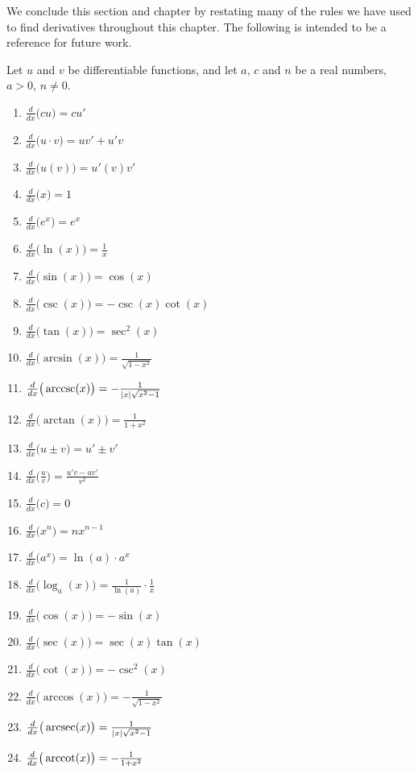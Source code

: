 We conclude this section and chapter by restating many of the rules we have used to find derivatives throughout this chapter. The following is intended to be a reference for future work.

{Let $u$ and $v$ be differentiable functions, and let $a$, $c$ and $n$ be a real numbers, $a>0$, $n\neq 0$. \\ \small

\bmtwo
\begin{enumerate}[1)]
\item $\frac{d}{dx}\big(cu\big) = cu'$
\item $\frac{d}{dx}\big(u\cdot v\big) = uv'+u'v$
\item $\frac{d}{dx}\big(u(v)\big) = u'(v)v'$
\item $\frac{d}{dx}\big(x\big) = 1$
\item $\frac{d}{dx}\big(e^x\big) = e^x$
\item $\frac{d}{dx}\big(\ln(x)\big) = \frac{1}{x}$
\item $\frac{d}{dx}\big(\sin(x)\big) = \cos(x)$
\item $\frac{d}{dx}\big(\csc(x)\big) = -\csc(x)\cot(x)$
\item $\frac{d}{dx}\big(\tan(x)\big) = \sec^2(x)$
\item $\frac{d}{dx}\big(\arcsin(x)\big) = \frac{1}{\sqrt{1-x^2}}$
\item $\frac{d}{dx}\big(\operatorname{arccsc}(x)\big) = -\frac{1}{|x|\sqrt{x^2-1}}$
\item $\frac{d}{dx}\big(\arctan(x)\big) = \frac{1}{1+x^2}$
\item $\frac{d}{dx}\big(u\pm v\big) = u'\pm v'$
\item $\frac{d}{dx}\big(\frac uv\big) = \frac{u'v-uv'}{v^2}$
\item $\frac{d}{dx}\big(c\big) = 0$
\item $\frac{d}{dx}\big(x^n\big) = nx^{n-1}$
\item $\frac{d}{dx}\big(a^x\big) = \ln(a) \cdot a^x$
\item $\frac{d}{dx}\big(\log_a(x)\big) = \frac{1}{\ln(a)}\cdot\frac{1}{x}$
\item $\frac{d}{dx}\big(\cos(x)\big) = -\sin(x)$
\item $\frac{d}{dx}\big(\sec(x)\big) = \sec(x)\tan(x)$
\item $\frac{d}{dx}\big(\cot(x)\big) = -\csc^2(x)$
\item $\frac{d}{dx}\big(\arccos(x)\big) = -\frac{1}{\sqrt{1-x^2}}$
\item $\frac{d}{dx}\big(\operatorname{arcsec}(x)\big) = \frac{1}{|x|\sqrt{x^2-1}}$
\item $\frac{d}{dx}\big(\operatorname{arccot}(x)\big) = -\frac{1}{1+x^2}$
\end{enumerate}
\emtwo
\normalsize
} %

